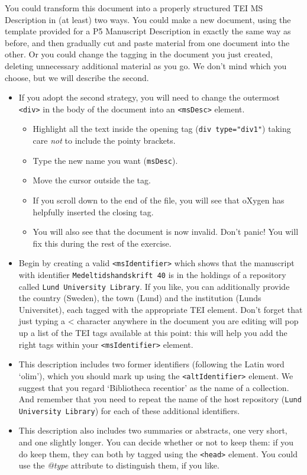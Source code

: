 \documentclass[11pt,twoside]{article}\makeatletter
\begin{document}
You could transform this document into a properly structured TEI MS Description in (at least) two ways. You could make a new document, using the template provided for a P5 Manuscript Description in exactly the same way as before, and then gradually cut and paste material from one document into the other. Or you could change the tagging in the document you just created, deleting unnecessary additional material as you go. We don't mind which you choose, but we will describe the second. \begin{itemize}
\item If you adopt the second strategy, you will need to change the outermost \texttt{<div>} in the body of the document into an \texttt{<msDesc>} element. \begin{itemize}
\item Highlight all the text inside the opening tag (\texttt{div type="div1"}) taking care \textit{not} to include the pointy brackets.
\item Type the new name you want (\texttt{msDesc}).
\item Move the cursor outside the tag.
\item If you scroll down to the end of the file, you will see that oXygen has helpfully inserted the closing tag. 
\item You will also see that the document is now invalid. Don't panic! You will fix this during the rest of the exercise. 
\end{itemize} 
\item Begin by creating a valid \texttt{<msIdentifier>} which shows that the manuscript with identifier \texttt{Medeltidshandskrift 40} is in the holdings of a repository called \texttt{Lund University Library}. If you like, you can additionally provide the country (Sweden), the town (Lund) and the institution (Lunds Universitet), each tagged with the appropriate TEI element. Don't forget that just typing a < character anywhere in the document you are editing will pop up a list of the TEI tags available at this point: this will help you add the right tags within your \texttt{<msIdentifier>} element.
\item This description includes two former identifiers (following the Latin word ‘olim’), which you should mark up using the \texttt{<altIdentifier>} element. We suggest that you regard ‘Bibliotheca recentior’ as the name of a collection. And remember that you need to repeat the name of the host repository (\texttt{Lund University Library}) for each of these additional identifiers.
\item This description also includes two summaries or abstracts, one very short, and one slightly longer. You can decide whether or not to keep them: if you do keep them, they can both by tagged using the \texttt{<head>} element. You could use the \textit{@type} attribute to distinguish them, if you like.
\end{itemize} \par
\end{document}
